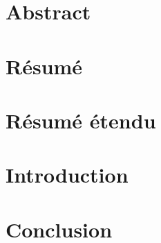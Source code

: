 \documentclass[12pt, twoside]{book}
\begin{document}
    \dominitoc
    \frontmatter
    \pagestyle{plain}
    
    
    
    \chapter{Abstract}
        
    \chapter{Résumé}
        
    \chapter{Résumé étendu}
        
    

    \tableofcontents
    \printglossary[type=\acronymtype]
    \printglossary

    \mainmatter
    \chapter{Introduction}
        

    \chapter{Conclusion}
        
        
    \printindex
\end{document}

